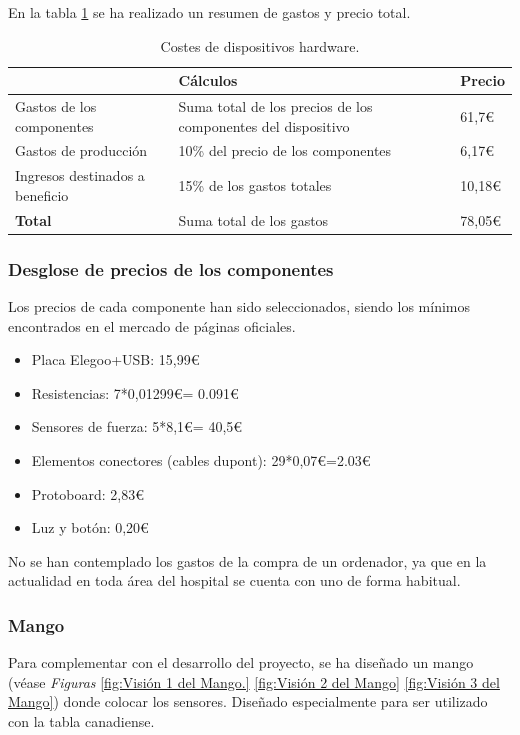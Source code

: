 En la tabla \ref{tab:costes_hardware} se ha realizado un resumen de gastos y precio total. 
\begin{table}[]
\centering
\begin{tabular}{|l|p{8cm}|l|}
\hline
\rowcolor[HTML]{BFBFBF} 
\textbf{} & \textbf{Cálculos} & \textbf{Precio} \\ \hline
Gastos de los componentes & Suma total de los precios de los componentes del dispositivo & 61,7€\\ \hline
Gastos de producción & 10\% del precio de los
 componentes & 6,17€\\ \hline
Ingresos destinados a beneficio & 15\% de los gastos totales & 10,18€\\ \hline
\textbf{Total}& Suma total de los gastos & 78,05€ \\ \hline
\end{tabular}
\caption{Costes de dispositivos hardware.}
\label{tab:costes_hardware}
\end{table}

\subsubsection{\textbf{Desglose de precios de los componentes}}
Los precios de cada componente han sido seleccionados, siendo los mínimos encontrados en el mercado de páginas oficiales.
\begin{itemize}
    \item Placa Elegoo+USB: 15,99€
    \item Resistencias: 7*0,01299€= 0.091€
    \item Sensores de fuerza: 5*8,1€= 40,5€
    \item Elementos conectores (cables dupont): 29*0,07€=2.03€
    \item Protoboard: 2,83€
    \item Luz y botón: 0,20€
\end{itemize}
No se han contemplado los gastos de la compra de un ordenador, ya que en la actualidad en toda área del hospital se cuenta con uno de forma habitual. 

\subsubsection{Mango}

Para complementar con el desarrollo del proyecto, se ha diseñado un mango (véase \textit{Figuras} \ref{fig:Visión 1 del Mango.} \ref{fig:Visión 2 del Mango} \ref{fig:Visión 3 del Mango}) donde colocar los sensores. Diseñado especialmente para ser utilizado con la tabla canadiense. 


